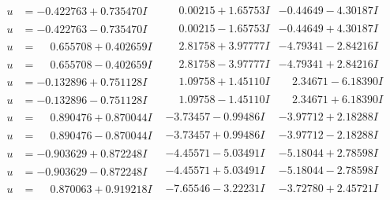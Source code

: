 \documentclass[1p]{elsarticle_modified}
\theoremstyle{definition}
\begin{document}
$$\begin{array}{c|c|c}
\begin{aligned}
u &= -0.422763 + 0.735470 I\end{aligned}
 & \phantom{-}0.00215 + 1.65753 I & -0.44649 - 4.30187 I \\ \hline\begin{aligned}
u &= -0.422763 - 0.735470 I\end{aligned}
 & \phantom{-}0.00215 - 1.65753 I & -0.44649 + 4.30187 I \\ \hline\begin{aligned}
u &= \phantom{-}0.655708 + 0.402659 I\end{aligned}
 & \phantom{-}2.81758 + 3.97777 I & -4.79341 - 2.84216 I \\ \hline\begin{aligned}
u &= \phantom{-}0.655708 - 0.402659 I\end{aligned}
 & \phantom{-}2.81758 - 3.97777 I & -4.79341 + 2.84216 I \\ \hline\begin{aligned}
u &= -0.132896 + 0.751128 I\end{aligned}
 & \phantom{-}1.09758 + 1.45110 I & \phantom{-}2.34671 - 6.18390 I \\ \hline\begin{aligned}
u &= -0.132896 - 0.751128 I\end{aligned}
 & \phantom{-}1.09758 - 1.45110 I & \phantom{-}2.34671 + 6.18390 I \\ \hline\begin{aligned}
u &= \phantom{-}0.890476 + 0.870044 I\end{aligned}
 & -3.73457 - 0.99486 I & -3.97712 + 2.18288 I \\ \hline\begin{aligned}
u &= \phantom{-}0.890476 - 0.870044 I\end{aligned}
 & -3.73457 + 0.99486 I & -3.97712 - 2.18288 I \\ \hline\begin{aligned}
u &= -0.903629 + 0.872248 I\end{aligned}
 & -4.45571 - 5.03491 I & -5.18044 + 2.78598 I \\ \hline\begin{aligned}
u &= -0.903629 - 0.872248 I\end{aligned}
 & -4.45571 + 5.03491 I & -5.18044 - 2.78598 I \\ \hline\begin{aligned}
u &= \phantom{-}0.870063 + 0.919218 I\end{aligned}
 & -7.65546 - 3.22231 I & -3.72780 + 2.45721 I \\ \hline\begin{aligned}

\end{aligned}
\end{array}$$
\end{document}
